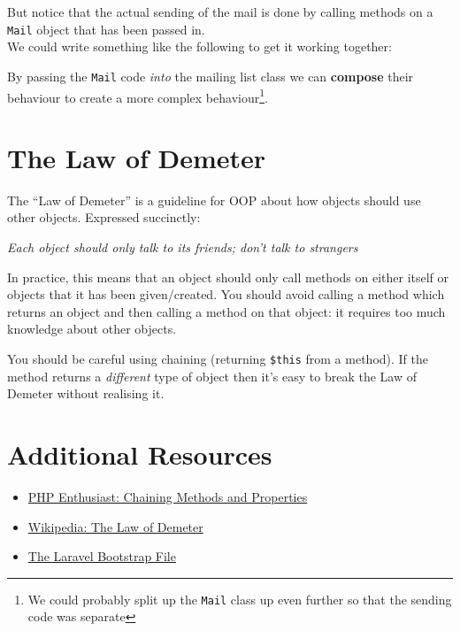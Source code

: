 
But notice that the actual sending of the mail is done by calling methods on a \texttt{Mail} object that has been passed in.
\\

We could write something like the following to get it working together:


By passing the \texttt{Mail} code \textit{into} the mailing list class we can \textbf{compose} their behaviour to create a more complex behaviour\footnote{We could probably split up the \texttt{Mail} class up even further so that the sending code was separate}.


\section{The Law of Demeter}

The ``Law of Demeter'' is a guideline for OOP about how objects should use other objects. Expressed succinctly:
\\

\begin{center}
    \textit{Each object should only talk to its friends; don't talk to strangers}
\end{center}
\par\bigskip


In practice, this means that an object should only call methods on either itself or objects that it has been given/created. You should avoid calling a method which returns an object and then calling a method on that object: it requires too much knowledge about other objects.


You should be careful using chaining (returning \texttt{\$this} from a method). If the method returns a \textit{different} type of object then it's easy to break the Law of Demeter without realising it.


\section{Additional Resources}

\begin{itemize}[leftmargin=*]
    \item \href{ https://phpenthusiast.com/object-oriented-php-tutorials/chaining-methods-and-properties}{PHP Enthusiast: Chaining Methods and Properties}
    \item \href{https://en.wikipedia.org/wiki/Law_of_Demeter}{Wikipedia: The Law of Demeter}
    \item \href{https://github.com/laravel/laravel/blob/master/bootstrap/app.php}{The Laravel Bootstrap File}
\end{itemize}
